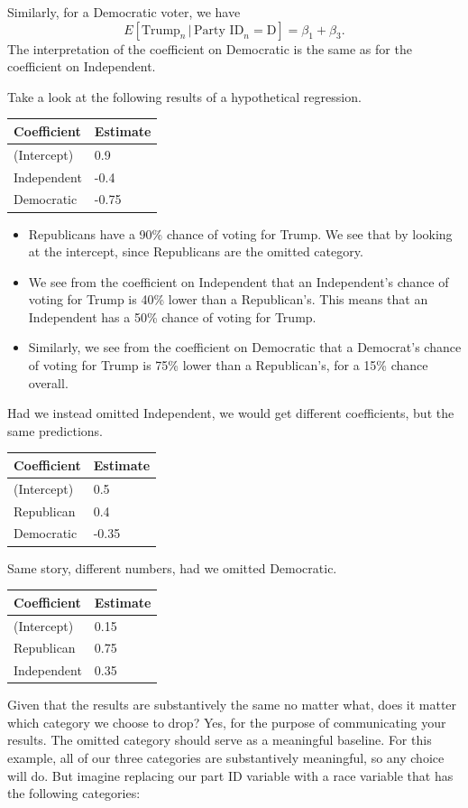 \documentclass[12pt,oneside,openany]{book}
\begin{document}
Similarly, for a Democratic voter, we have \[
E[\text{Trump}_n \,|\, \text{Party ID}_n = \text{D}] = \beta_1 + \beta_3.
\] The interpretation of the coefficient on Democratic is the same as
for the coefficient on Independent.

Take a look at the following results of a hypothetical regression.

\begin{longtable}[]{@{}ll@{}}
\toprule
Coefficient & Estimate\tabularnewline
\midrule
\endhead
(Intercept) & 0.9\tabularnewline
Independent & -0.4\tabularnewline
Democratic & -0.75\tabularnewline
\bottomrule
\end{longtable}

\begin{itemize}
\item
  Republicans have a 90\% chance of voting for Trump. We see that by
  looking at the intercept, since Republicans are the omitted category.
\item
  We see from the coefficient on Independent that an Independent's
  chance of voting for Trump is 40\% lower than a Republican's. This
  means that an Independent has a 50\% chance of voting for Trump.
\item
  Similarly, we see from the coefficient on Democratic that a Democrat's
  chance of voting for Trump is 75\% lower than a Republican's, for a
  15\% chance overall.
\end{itemize}

Had we instead omitted Independent, we would get different coefficients,
but the same predictions.

\begin{longtable}[]{@{}ll@{}}
\toprule
Coefficient & Estimate\tabularnewline
\midrule
\endhead
(Intercept) & 0.5\tabularnewline
Republican & 0.4\tabularnewline
Democratic & -0.35\tabularnewline
\bottomrule
\end{longtable}

Same story, different numbers, had we omitted Democratic.

\begin{longtable}[]{@{}ll@{}}
\toprule
Coefficient & Estimate\tabularnewline
\midrule
\endhead
(Intercept) & 0.15\tabularnewline
Republican & 0.75\tabularnewline
Independent & 0.35\tabularnewline
\bottomrule
\end{longtable}

Given that the results are substantively the same no matter what, does
it matter which category we choose to drop? Yes, for the purpose of
communicating your results. The omitted category should serve as a
meaningful baseline. For this example, all of our three categories are
substantively meaningful, so any choice will do. But imagine replacing
our part ID variable with a race variable that has the following
categories:
\end{document}
